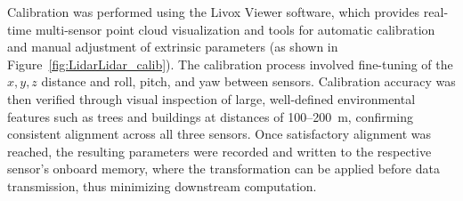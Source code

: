 \documentclass[../main.tex]{subfiles}
\begin{document}


Calibration was performed using the Livox Viewer software, which provides real-time multi-sensor point cloud visualization and tools for automatic calibration and manual adjustment of extrinsic parameters (as shown in Figure~\ref{fig:LidarLidar_calib}). 
The calibration process involved fine-tuning of the $x, y, z$ distance and roll, pitch, and yaw between sensors.
Calibration accuracy was then verified through visual inspection of large, well-defined environmental features such as trees and buildings at distances of 100–200~m, confirming consistent alignment across all three sensors.
Once satisfactory alignment was reached, the resulting parameters were recorded and written to the respective sensor’s onboard memory, where the transformation can be applied before data transmission, thus minimizing downstream computation. 

\end{document}
